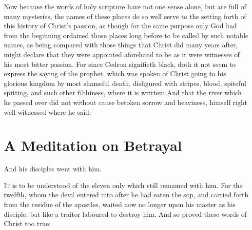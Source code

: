 \documentclass[a5paper]{scrbook}
\begin{document}
	Now because the words of holy scripture have not one sense alone, but are full of many mysteries, the names of these places do so well serve to the setting forth of this history of Christ's passion, as though for the same purpose only God had from the beginning ordained those places long before to be called by such notable names, as being compared with those things that Christ did many years after, might declare that they were appointed aforehand to be as it were witnesses of his most bitter passion. For since Cedron signifieth black, doth it not seem to express the saying of the prophet, which was spoken of Christ going to his glorious kingdom by most shameful death, disfigured with stripes, blood, spiteful spitting, and such other filthiness, where it is written:  And that the river which he passed over did not without cause betoken sorrow and heaviness, himself right well witnessed where he said: 
	
	\chapter{A Meditation on Betrayal}
	
	\begin{scripture}[Luke 22:39]
		And his disciples went with him.
	\end{scripture}
	
	\vspace{10mm}
	
	\lettrine{I}{t} is to be understood of the eleven only which still remained with him. For the twelfth, whom the devil entered into after he had eaten the sop, and carried forth from the residue of the apostles, waited now no longer upon his master as his disciple, but like a traitor laboured to destroy him. And so proved these words of Christ too true: 
	
\end{document}
